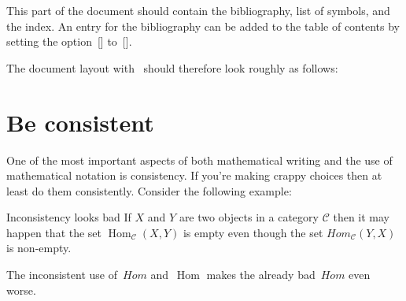 \begin{myitemize}
    This part of the document should contain the bibliography, list of symbols, and the index.
    An entry for the bibliography can be added to the table of contents by setting the option~[\optname] to~[\optname].
\end{myitemize}

The document layout with~ should therefore look roughly as follows:






\section{Be consistent}

One of the most important aspects of both mathematical writing and the use of mathematical notation is consistency.
If you’re making crappy choices then at least do them consistently.
Consider the following example:
% 
% 
\begin{showlatex}{Inconsistency looks bad}
If $X$ and $Y$ are two objects in a category $$ then it may happen that the set $_{\mathcal{C}}(X,Y)$ is empty even though the set $Hom_{\mathcal{C}}(Y,X)$ is non-empty.
\end{showlatex}
The inconsistent use of~$Hom$ and~$$ makes the already bad~$Hom$ even worse.




